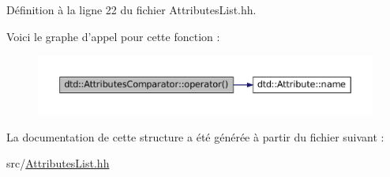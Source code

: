 Définition à la ligne 22 du fichier AttributesList.hh.



Voici le graphe d'appel pour cette fonction :\nopagebreak
\begin{figure}[H]
\begin{center}
\leavevmode
\includegraphics[width=400pt]{structdtd_1_1_attributes_comparator_abfedc16b191edd3b2acd4cfc5522417b_cgraph}
\end{center}
\end{figure}




La documentation de cette structure a été générée à partir du fichier suivant :\begin{DoxyCompactItemize}
\item 
src/\hyperlink{_attributes_list_8hh}{AttributesList.hh}\end{DoxyCompactItemize}
